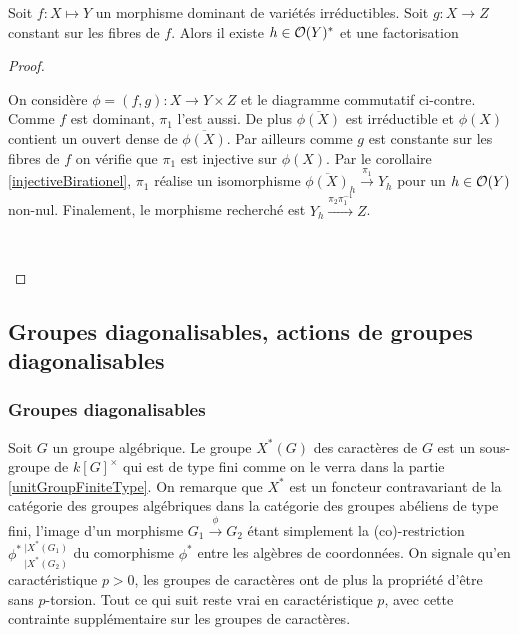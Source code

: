 \begin{lem}
Soit $f:X \mapsto Y$ un morphisme dominant de variétés irréductibles. Soit $g:X \rightarrow Z$ constant sur les fibres de $f$. Alors il existe $h\in \mathcal{O}(Y)^*$ et une factorisation
\end{lem}
\begin{proof}
	\begin{multicols}{2}
	On considère $\phi=(f,g):X\rightarrow Y\times Z$ et le diagramme commutatif ci-contre. Comme $f$ est dominant, $\pi_1$ l'est aussi. De plus $\overline{\phi(X)}$ est irréductible et $\phi(X)$ contient un ouvert dense de $\overline{\phi(X)}$. Par ailleurs comme $g$ est constante sur les fibres de $f$ on vérifie que $\pi_1$ est injective sur $\phi(X)$. Par le corollaire \ref{injectiveBirationel}, $\pi_1$ réalise un isomorphisme $\overline{\phi(X)}_h \xrightarrow{\pi_1} Y_h$ pour un $h\in \mathcal{O}(Y)$ non-nul. Finalement, le morphisme recherché est  $Y_h \xrightarrow{\pi_2\pi_1^{-1}} Z$.
	
	\columnbreak
	\begin{center}
	\\
	\end{center}
	\end{multicols}
\end{proof}


\subsection{Groupes diagonalisables, actions de groupes diagonalisables}

\subsubsection{Groupes diagonalisables}
Soit $G$ un groupe algébrique. Le groupe $X^*(G)$ des caractères de $G$ est un sous-groupe de $k[G]^\times$ qui est de type fini comme on le verra dans la partie \ref{unitGroupFiniteType}. On remarque que $X^*$ est un foncteur contravariant de la catégorie des groupes algébriques dans la catégorie des groupes abéliens de type fini, l'image d'un morphisme $G_1\xrightarrow{\phi}G_2$ étant simplement la (co)-restriction $\phi^* \,_{|X^*(G_2)}^{|X^*(G_1)}$ du comorphisme $\phi^*$ entre les algèbres de coordonnées. On signale qu'en caractéristique $p>0$, les groupes de caractères ont de plus la propriété d'être sans $p$-torsion. Tout ce qui suit reste vrai en caractéristique $p$, avec cette contrainte supplémentaire sur les groupes de caractères.

